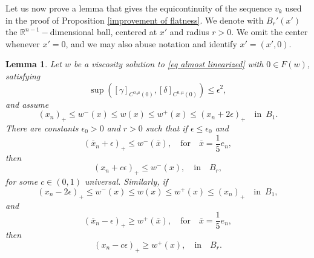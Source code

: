 \documentclass[reqno,11pt]{amsart}
\newtheorem{lemma}{Lemma}[section]
\newcommand{\1}{\mathds{1}}
\numberwithin{equation}{section}
\begin{document}
Let us now prove a lemma that gives the equicontinuity of the sequence $v_k$ used in the proof of Proposition \ref{improvement of flatness}. We denote with $B_r'(x')$ the $\mathbb{R}^{n-1}-$di\-mensional ball, centered at $x'$ and radius $r>0$. We omit the center whenever $x' = 0$, and we may also abuse notation and identify $x' = (x',0)$.

\begin{lemma}\label{almost equicontinuity}
Let $w$ be a viscosity solution to \eqref{eq almost linearized} with $0 \in F(w)$, satisfying
\begin{equation}\label{smallness of oscillating}
    \sup\left([\gamma]_{C^{0,\mu}(0)}, [\delta]_{C^{0,\mu}(0)}\right) \leq \epsilon^2,
\end{equation}
and assume
\begin{equation*}
    (x_n)_+ \leq w^-(x) \leq w(x) \leq w^+(x) \leq (x_n + 2 \epsilon)_+ \quad \text{in }\, B_1.
\end{equation*}
There are constants $\epsilon_0>0$ and $r>0$ such that if $\epsilon \leq \epsilon_0$ and
$$
    (\overline{x}_n + \epsilon)_+ \leq w^-(\overline{x}), \quad \text{for} \quad \overline{x} = \frac{1}{5}e_n,
$$
then
$$
    \left(x_n + c \epsilon\right)_+ \leq w^-(x), \quad \text{in} \quad B_r,
$$
for some $c \in (0,1)$ universal. Similarly, if
\begin{equation*}
    (x_n - 2\epsilon)_+ \leq w^-(x) \leq w(x) \leq w^+(x) \leq (x_n)_+ \quad \text{in }\, B_1,
\end{equation*}
and
$$
    (\overline{x}_n - \epsilon)_+ \geq w^+(\overline{x}), \quad \text{for} \quad \overline{x} = \frac{1}{5}e_n,
$$
then
$$
    \left(x_n - c \epsilon\right)_+ \geq w^+(x), \quad \text{in} \quad B_r.
$$
\end{lemma}
\end{document}
